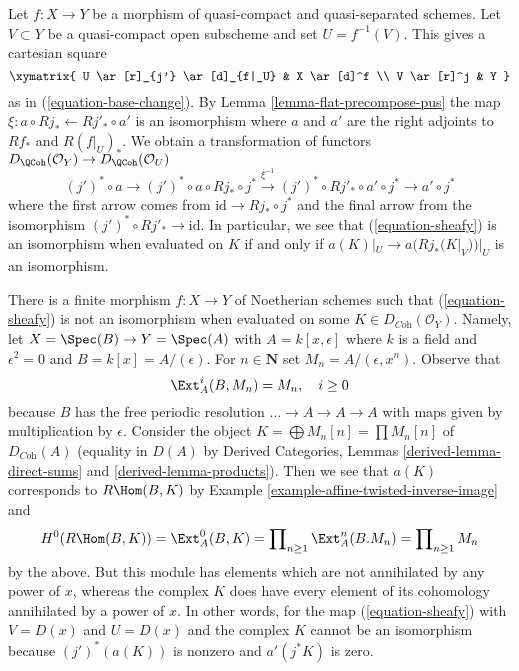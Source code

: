 \noindent
Let $f : X \to Y$ be a morphism of quasi-compact and quasi-separated
schemes. Let $V \subset Y$ be a quasi-compact open subscheme and set
$U = f^{-1}(V)$. This gives a cartesian square
$$
\xymatrix{
U \ar[r]_{j'} \ar[d]_{f|_U} & X \ar[d]^f \\
V \ar[r]^j & Y
}
$$
as in (\ref{equation-base-change}). By Lemma \ref{lemma-flat-precompose-pus}
the map $\xi : a \circ Rj_* \leftarrow Rj'_* \circ a'$ is an isomorphism
where $a$ and $a'$ are the right adjoints to
$Rf_*$ and $R(f|_U)_*$. We obtain a transformation
of functors $D_\QCoh(\mathcal{O}_Y) \to D_\QCoh(\mathcal{O}_U)$
\begin{equation}
\label{equation-sheafy}
(j')^* \circ a \to
(j')^* \circ a \circ Rj_* \circ j^* \xrightarrow{\xi^{-1}}
(j')^* \circ Rj'_* \circ a' \circ j^* \to a' \circ j^*
\end{equation}
where the first arrow comes from $\text{id} \to Rj_* \circ j^*$
and the final arrow from the isomorphism $(j')^* \circ Rj'_* \to \text{id}$.
In particular, we see that (\ref{equation-sheafy}) is an isomorphism
when evaluated on $K$ if and only if $a(K)|_U \to a(Rj_*(K|_V))|_U$
is an isomorphism.

\begin{example}
\label{example-not-supported-on-inverse-image}
There is a finite morphism $f : X \to Y$ of Noetherian schemes
such that (\ref{equation-sheafy}) is not an isomorphism
when evaluated on some
$K \in D_{\textit{Coh}}(\mathcal{O}_Y)$.
Namely, let $X = \Spec(B) \to Y = \Spec(A)$ with
$A = k[x, \epsilon]$ where $k$ is a field and $\epsilon^2 = 0$ and
$B = k[x] = A/(\epsilon)$. For $n \in \mathbf{N}$ set
$M_n = A/(\epsilon, x^n)$. Observe that
$$
\Ext^i_A(B, M_n) = M_n,\quad i \geq 0
$$
because $B$ has the free periodic resolution
$\ldots \to A \to A \to A$ with maps given by multiplication by $\epsilon$.
Consider the object
$K = \bigoplus M_n[n] = \prod M_n[n]$
of $D_{\textit{Coh}}(A)$ (equality in $D(A)$ by
Derived Categories, Lemmas \ref{derived-lemma-direct-sums} and
\ref{derived-lemma-products}). Then we see that $a(K)$ corresponds
to $R\Hom(B, K)$ by Example \ref{example-affine-twisted-inverse-image} and
$$
H^0(R\Hom(B, K)) = \Ext^0_A(B, K) =
\prod\nolimits_{n \geq 1} \Ext^n_A(B. M_n) = 
\prod\nolimits_{n \geq 1} M_n
$$
by the above. But this module has elements which are not
annihilated by any power of $x$, whereas the complex $K$
does have every element of its cohomology annihilated by
a power of $x$. In other words, for the map (\ref{equation-sheafy})
with $V = D(x)$ and $U = D(x)$ and the complex $K$ cannot
be an isomorphism because $(j')^*(a(K))$ is nonzero and
$a'(j^*K)$ is zero.
\end{example}

